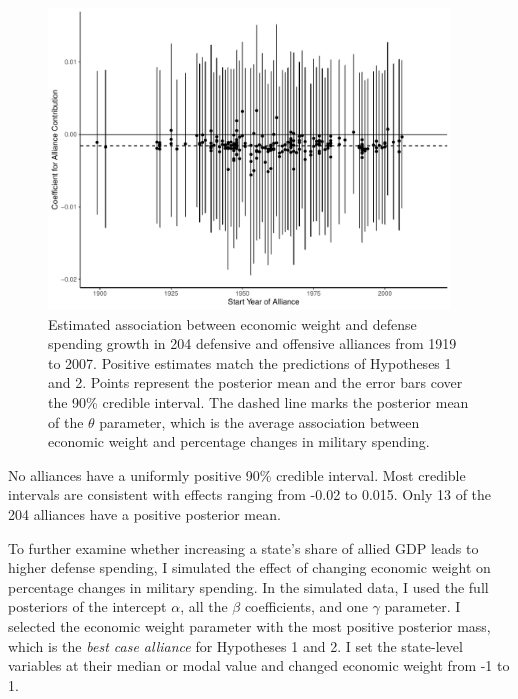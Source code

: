 \documentclass[12pt]{article}
\begin{document}
\begin{figure}[htbp]
	\centering
		\includegraphics[width=0.95\textwidth]{alliance-coefs-year.pdf}
	\caption{Estimated association between economic weight and defense spending growth in 204 defensive and offensive alliances from 1919 to 2007. Positive estimates match the predictions of Hypotheses 1 and 2. Points represent the posterior mean and the error bars cover the 90\% credible interval. The dashed line marks the posterior mean of the $\theta$ parameter, which is the average association between economic weight and percentage changes in military spending.}
	\label{fig:alliance-coefs-year}
\end{figure}


No alliances have a uniformly positive 90\% credible interval. 
Most credible intervals are consistent with effects ranging from -0.02 to 0.015. 
Only 13 of the 204 alliances have a positive posterior mean. 




To further examine whether increasing a state's share of allied GDP leads to higher defense spending, I simulated the effect of changing economic weight on percentage changes in military spending. 
In the simulated data, I used the full posteriors of the intercept $\alpha$, all the $\beta$ coefficients, and one $\gamma$ parameter. 
I selected the economic weight parameter with the most positive posterior mass, which is the \emph{best case alliance} for Hypotheses 1 and 2. 
I set the state-level variables at their median or modal value and changed economic weight from -1 to 1. 
\end{document}
